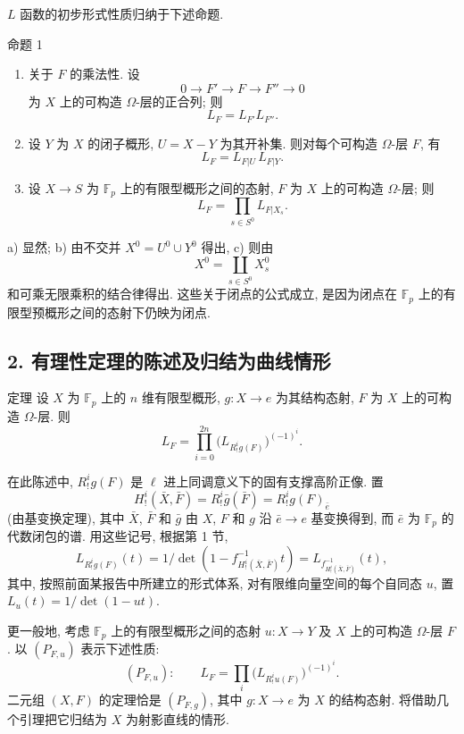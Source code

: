 $L$ 函数的初步形式性质归纳于下述命题.

\begin{statement}{命题 1}
\begin{enumerate}[label=\alph*)]
\item 关于 $F$ 的乘法性. 设
\[
0\longrightarrow F'\longrightarrow F\longrightarrow F''\longrightarrow0
\]
为 $X$ 上的可构造 $\Omega$-层的正合列; 则
\[
L_F=L_{F'}L_{F''}.
\]
\item 设 $Y$ 为 $X$ 的闭子概形, $U=X-Y$ 为其开补集. 则对每个可构造 $\Omega$-层 $F$, 有
\[
L_F=L_{F|U}\,L_{F|Y}
.\]

\item 设 $X\to S$ 为 $\mathbb F_p$ 上的有限型概形之间的态射, $F$ 为 $X$ 上的可构造 $\Omega$-层; 则
\[
L_F=\prod_{s\in S^0}L_{F|X_s}.
\]
\end{enumerate}
\end{statement}

a) 显然; b) 由不交并 $X^0=U^0\cup Y^0$ 得出, c) 则由
\[
X^0=\coprod_{s\in S^0}X_s^0
\]
和可乘无限乘积的结合律得出. 这些关于闭点的公式成立, 是因为闭点在 $\mathbb F_p$ 上的有限型预概形之间的态射下仍映为闭点.

\subsection*{2. 有理性定理的陈述及归结为曲线情形}

\begin{statement}{定理}
设 $X$ 为 $\mathbb F_p$ 上的 $n$ 维有限型概形, $g:X\to e$ 为其结构态射, $F$ 为 $X$ 上的可构造 $\Omega$-层. 则
\[
L_F=\prod_{i=0}^{2n}\bigl(L_{R^i_!g(F)}\bigr)^{(-1)^i}.
\tag{1}
\]
\end{statement}

在此陈述中, $R^i_!g(F)$ 是 $\ell$ 进上同调意义下的固有支撑高阶正像. 置
\[
H^i_!(\bar X,\bar F)=R^i_!\bar g(\bar F)=R^i_!g(F)_{\bar e}
\]
(由基变换定理), 其中 $\bar X$, $\bar F$ 和 $\bar g$ 由 $X$, $F$ 和 $g$ 沿 $\bar e\to e$ 基变换得到, 而 $\bar e$ 为 $\mathbb F_p$ 的代数闭包的谱. 用这些记号, 根据第 1 节,
\[
L_{R^i_!g(F)}(t)=1/\det(1-f^{-1}_{H^i_!(\bar X,\bar F)}t)
 =L_{f^{-1}_{H^i_!(\bar X,\bar F)}}(t),
\]
其中, 按照前面某报告中所建立的形式体系, 对有限维向量空间的每个自同态 $u$, 置 $L_u(t)=1/\det(1-ut)$.

更一般地, 考虑 $\mathbb F_p$ 上的有限型概形之间的态射 $u:X\to Y$ 及 $X$ 上的可构造 $\Omega$-层 $F$. 以 $(P_{F,u})$ 表示下述性质:
\[
(P_{F,u}):\qquad
L_F=\prod_i\bigl(L_{R^i_!u(F)}\bigr)^{(-1)^i}.
\]
二元组 $(X,F)$ 的定理恰是 $(P_{F,g})$, 其中 $g:X\to e$ 为 $X$ 的结构态射. 将借助几个引理把它归结为 $X$ 为射影直线的情形.

